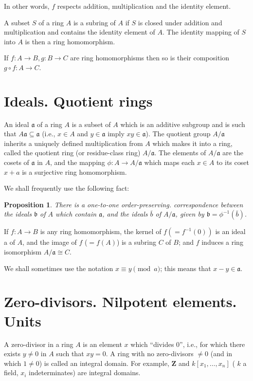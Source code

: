 \documentclass[class=book, crop=false]{standalone}
\newtheorem{proposition}[theorem]{Proposition}
\theoremstyle{definition}
\theoremstyle{remark}
\begin{document}
In other words, $f$ respects addition, multiplication and the identity element.

A subset $S$ of a ring $A$ is a subring of $A$ if $S$ is closed under addition
and multiplication and contains the identity element of $A$. The identity
mapping of $S$ into $A$ is then a ring homomorphism.

If $f: A\to B, g: B \to C$ are ring homomorphisms then so is their composition
$g \circ f: A \to C$.

\section{Ideals. Quotient rings}
An ideal $\mathfrak{a}$ of a ring $A$ is a subset of $A$ which is an additive
subgroup and is such that $A \mathfrak{a} \subseteq \mathfrak{a}$ (i.e.,
$x \in A$ and $y \in \mathfrak{a}$ imply $x y \in \mathfrak{a}$). The quotient
group $A / \mathfrak{a}$ inherits a uniquely defined multiplication from $A$
which makes it into a ring, called the quotient ring (or residue-class ring)
$A / \mathfrak{a}$. The elements of $A / \mathfrak{a}$ are the cosets of
$\mathfrak{a}$ in $A$, and the mapping $\phi: A \to A / \mathfrak{a}$ which maps
each $x \in A$ to its coset $x+a$ is a surjective ring homomorphism.

We shall frequently use the following fact:
\begin{proposition}\label{prop:1.1}
  There is a one-to-one order-preserving. correspondence between the ideals
  $\mathfrak{b}$ of $A$ which contain $\mathfrak{a}$, and the ideals $\bar{b}$
  of $A / \mathfrak{a}$, given by $\mathfrak{b}=\phi^{-1}(\bar{b})$.
\end{proposition}

If $f: A \to B$ is any ring homomorphism, the kernel of
$f\left(=f^{-1}(0)\right)$ is an ideal a of $A$, and the image of $f$ ($=f(A)$)
is a subring $C$ of $B$; and $f$ induces a ring isomorphism
$A / \mathfrak{a} \cong C$.

We shall sometimes use the notation $x \equiv y\pmod{a}$; this means that
$x-y \in \mathfrak{a}$.

\section{Zero-divisors. Nilpotent elements. Units}
A zero-divisor in a ring $A$ is an element $x$ which ``divides 0'', i.e., for
which there exists $y \neq 0$ in $A$ such that $x y=0$. A ring with no
zero-divisors $\neq 0$ (and in which $1 \neq 0$) is called an integral domain.
For example, $\mathbf{Z}$ and $k\left[x_{1}, \ldots, x_{n}\right]$ ( $k$ a
field, $x_{i}$ indeterminates) are integral domains.
\end{document}
